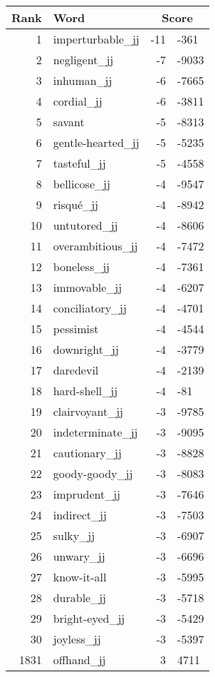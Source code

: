 \begin{longtable}[!htbp]{| rlr@{.}l |}
    \hline
    \textbf{Rank} & \textbf{Word} & \multicolumn{2}{c|}{\textbf{Score}} \\
    \hline
    \endhead
    1 & imperturbable\_jj & -11 & -361 \\
    2 & negligent\_jj & -7 & -9033 \\
    3 & inhuman\_jj & -6 & -7665 \\
    4 & cordial\_jj & -6 & -3811 \\
    5 & savant & -5 & -8313 \\
    6 & gentle-hearted\_jj & -5 & -5235 \\
    7 & tasteful\_jj & -5 & -4558 \\
    8 & bellicose\_jj & -4 & -9547 \\
    9 & risqué\_jj & -4 & -8942 \\
    10 & untutored\_jj & -4 & -8606 \\
    11 & overambitious\_jj & -4 & -7472 \\
    12 & boneless\_jj & -4 & -7361 \\
    13 & immovable\_jj & -4 & -6207 \\
    14 & conciliatory\_jj & -4 & -4701 \\
    15 & pessimist & -4 & -4544 \\
    16 & downright\_jj & -4 & -3779 \\
    17 & daredevil & -4 & -2139 \\
    18 & hard-shell\_jj & -4 & -81 \\
    19 & clairvoyant\_jj & -3 & -9785 \\
    20 & indeterminate\_jj & -3 & -9095 \\
    21 & cautionary\_jj & -3 & -8828 \\
    22 & goody-goody\_jj & -3 & -8083 \\
    23 & imprudent\_jj & -3 & -7646 \\
    24 & indirect\_jj & -3 & -7503 \\
    25 & sulky\_jj & -3 & -6907 \\
    26 & unwary\_jj & -3 & -6696 \\
    27 & know-it-all & -3 & -5995 \\
    28 & durable\_jj & -3 & -5718 \\
    29 & bright-eyed\_jj & -3 & -5429 \\
    30 & joyless\_jj & -3 & -5397 \\
    1831 & offhand\_jj & 3 & 4711 \\

\end{longtable}
